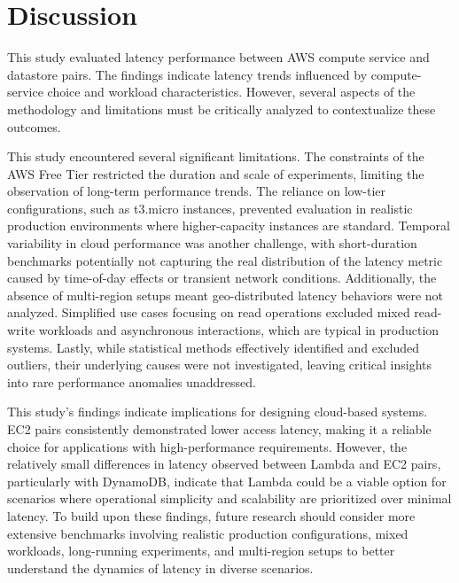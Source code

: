 \section{Discussion}
\label{cha:discuss}

This study evaluated latency performance between AWS compute service and datastore pairs. The findings indicate latency trends influenced by compute-service choice and workload characteristics. However, several aspects of the methodology and limitations must be critically analyzed to contextualize these outcomes.

This study encountered several significant limitations. The constraints of the AWS Free Tier restricted the duration and scale of experiments, limiting the observation of long-term performance trends. The reliance on low-tier configurations, such as t3.micro instances, prevented evaluation in realistic production environments where higher-capacity instances are standard. Temporal variability in cloud performance was another challenge, with short-duration benchmarks potentially not capturing the real distribution of the latency metric caused by time-of-day effects or transient network conditions. Additionally, the absence of multi-region setups meant geo-distributed latency behaviors were not analyzed. Simplified use cases focusing on read operations excluded mixed read-write workloads and asynchronous interactions, which are typical in production systems. Lastly, while statistical methods effectively identified and excluded outliers, their underlying causes were not investigated, leaving critical insights into rare performance anomalies unaddressed.

This study's findings indicate implications for designing cloud-based systems. EC2 pairs consistently demonstrated lower access latency, making it a reliable choice for applications with high-performance requirements. However, the relatively small differences in latency observed between Lambda and EC2 pairs, particularly with DynamoDB, indicate that Lambda could be a viable option for scenarios where operational simplicity and scalability are prioritized over minimal latency. To build upon these findings, future research should consider more extensive benchmarks involving realistic production configurations, mixed workloads, long-running experiments, and multi-region setups to better understand the dynamics of latency in diverse scenarios.
